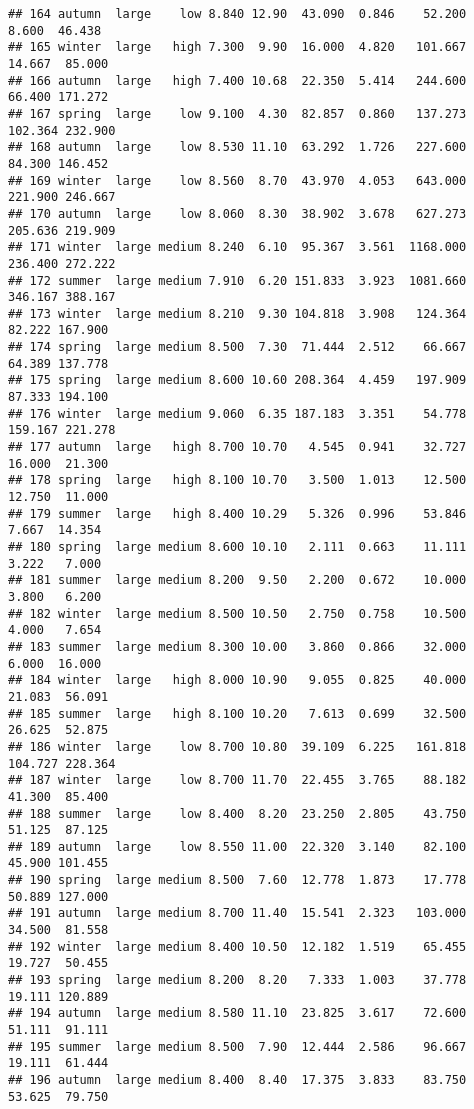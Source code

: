 \documentclass[
]{article}
\begin{document}
\begin{verbatim}
## 164 autumn  large    low 8.840 12.90  43.090  0.846    52.200   8.600  46.438
## 165 winter  large   high 7.300  9.90  16.000  4.820   101.667  14.667  85.000
## 166 autumn  large   high 7.400 10.68  22.350  5.414   244.600  66.400 171.272
## 167 spring  large    low 9.100  4.30  82.857  0.860   137.273 102.364 232.900
## 168 autumn  large    low 8.530 11.10  63.292  1.726   227.600  84.300 146.452
## 169 winter  large    low 8.560  8.70  43.970  4.053   643.000 221.900 246.667
## 170 autumn  large    low 8.060  8.30  38.902  3.678   627.273 205.636 219.909
## 171 winter  large medium 8.240  6.10  95.367  3.561  1168.000 236.400 272.222
## 172 summer  large medium 7.910  6.20 151.833  3.923  1081.660 346.167 388.167
## 173 winter  large medium 8.210  9.30 104.818  3.908   124.364  82.222 167.900
## 174 spring  large medium 8.500  7.30  71.444  2.512    66.667  64.389 137.778
## 175 spring  large medium 8.600 10.60 208.364  4.459   197.909  87.333 194.100
## 176 winter  large medium 9.060  6.35 187.183  3.351    54.778 159.167 221.278
## 177 autumn  large   high 8.700 10.70   4.545  0.941    32.727  16.000  21.300
## 178 spring  large   high 8.100 10.70   3.500  1.013    12.500  12.750  11.000
## 179 summer  large   high 8.400 10.29   5.326  0.996    53.846   7.667  14.354
## 180 spring  large medium 8.600 10.10   2.111  0.663    11.111   3.222   7.000
## 181 summer  large medium 8.200  9.50   2.200  0.672    10.000   3.800   6.200
## 182 winter  large medium 8.500 10.50   2.750  0.758    10.500   4.000   7.654
## 183 summer  large medium 8.300 10.00   3.860  0.866    32.000   6.000  16.000
## 184 winter  large   high 8.000 10.90   9.055  0.825    40.000  21.083  56.091
## 185 summer  large   high 8.100 10.20   7.613  0.699    32.500  26.625  52.875
## 186 winter  large    low 8.700 10.80  39.109  6.225   161.818 104.727 228.364
## 187 winter  large    low 8.700 11.70  22.455  3.765    88.182  41.300  85.400
## 188 summer  large    low 8.400  8.20  23.250  2.805    43.750  51.125  87.125
## 189 autumn  large    low 8.550 11.00  22.320  3.140    82.100  45.900 101.455
## 190 spring  large medium 8.500  7.60  12.778  1.873    17.778  50.889 127.000
## 191 autumn  large medium 8.700 11.40  15.541  2.323   103.000  34.500  81.558
## 192 winter  large medium 8.400 10.50  12.182  1.519    65.455  19.727  50.455
## 193 spring  large medium 8.200  8.20   7.333  1.003    37.778  19.111 120.889
## 194 autumn  large medium 8.580 11.10  23.825  3.617    72.600  51.111  91.111
## 195 summer  large medium 8.500  7.90  12.444  2.586    96.667  19.111  61.444
## 196 autumn  large medium 8.400  8.40  17.375  3.833    83.750  53.625  79.750

\end{verbatim}
\end{document}
